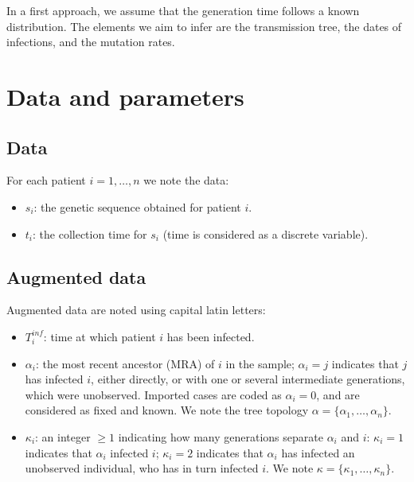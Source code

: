 \documentclass[10pt]{article}
\begin{document}
In a first approach, we assume that the generation time follows a known distribution.
The elements we aim to infer are the transmission tree, the dates of infections, and the mutation rates.




\section*{Data and parameters}

\subsection*{Data}
For each patient $i=1,\ldots,n$ we note the data:
\begin{itemize}
	\item $s_i$: the genetic sequence obtained for patient $i$.
	\item $t_i$: the collection time for $s_i$ (time is considered as a discrete variable).
\end{itemize}



\subsection*{Augmented data}
Augmented data are noted using capital latin letters:
\begin{itemize}
	\item $T_i^{inf}$: time at which patient $i$ has been infected.
	\item $\alpha_i$: the most recent ancestor (MRA) of $i$ in the sample; $\alpha_i=j$ indicates that $j$ has infected $i$, either directly, or with one or several intermediate generations, which were unobserved. Imported cases are coded as $\alpha_i=0$, and are considered as fixed and known. We note the tree topology $\alpha = \{\alpha_1, \ldots, \alpha_n\}$.
 	\item $\kappa_i$: an integer $\geq 1$ indicating how many generations separate $\alpha_i$ and $i$: $\kappa_i=1$ indicates that $\alpha_i$ infected $i$; $\kappa_i=2$ indicates that $\alpha_i$ has infected an unobserved individual, who has in turn infected $i$. We note $\kappa = \{\kappa_1, \ldots, \kappa_n\}$.
\end{itemize}
\end{document}
